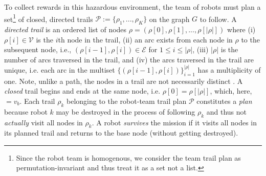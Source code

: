 \documentclass[11pt, oneside]{article}
\begin{document}
To collect rewards in this hazardous environment, the team of robots must plan a set\footnote{Since the robot team is homogenous, we consider the team trail plan as permutation-invariant and thus treat it as a set not a list.} of closed, directed trails $\mathcal{P}:=\{\rho_1, ..., \rho_K\}$ on the graph $G$ to follow.
A \emph{directed trail} \cite{clark1991first,graphtheory2} is an ordered list of nodes $\rho = (\rho[0], \rho[1], ..., \rho[\lvert \rho \rvert])$ where
(i) $\rho[i] \in \mathcal{V}$ is the $i$th node in the trail,  
(ii) an arc exists from each node in $\rho$ to the subsequent node, i.e., $(\rho[i-1], \rho[i])\in\mathcal{E}$ for $1 \leq i  \leq \lvert \rho \rvert$,
(iii) $\lvert \rho \rvert$ is the number of arcs traversed in the trail,
and
(iv) the arcs traversed in the trail are unique, i.e. each arc in the multiset $\{(\rho[i-1], \rho[i])\}_{i=1}^{\lvert \rho \rvert}$ has a multiplicity of one.
Note, unlike a path, the nodes in a trail are not necessarily distinct \cite{wilson1979introduction}.
A \emph{closed} trail begins and ends at the same node, i.e. $\rho [0]=\rho[\lvert \rho \rvert]$, which, here, $=v_b$.
Each trail $\rho_k$ belonging to the robot-team trail plan $\mathcal{P}$ constitutes a \emph{plan} because robot $k$ may be destroyed in the process of following $\rho_k$ and thus not \emph{actually} visit all nodes in $\rho_k$. A robot \emph{survives} the mission if it visits all nodes in its planned trail and returns to the base node (without getting destroyed).
\end{document}
